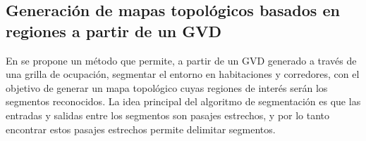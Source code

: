 

\subsection{Generación de mapas topológicos basados en regiones a partir de un GVD}\label{subsec:mapaTopGVD}
En \cite{Thrun1998} se propone un método que permite, a partir de un GVD
generado a través de una grilla de ocupación, segmentar el entorno en
habitaciones y corredores, con el objetivo de generar un mapa topológico cuyas
regiones de interés serán los segmentos reconocidos. La idea principal del
algoritmo de segmentación es que las entradas y salidas entre los segmentos son
pasajes estrechos, y por lo tanto encontrar estos pasajes estrechos permite
delimitar segmentos.

